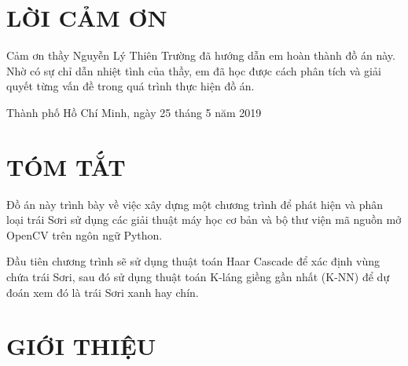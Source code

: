 \documentclass[12pt,a4paper]{article}
\begin{document}
\setcounter{page}{1}
\section*{LỜI CẢM ƠN}
Cảm ơn thầy Nguyễn Lý Thiên Trường đã hướng dẫn em hoàn thành đồ án này. Nhờ có sự chỉ dẫn nhiệt tình của thầy, em đã học được cách phân tích và giải quyết từng vấn đề trong quá trình thực hiện đồ án.

\begin{flushright}
Thành phố Hồ Chí Minh, ngày 25 tháng 5 năm 2019 
\end{flushright} 
\pagebreak
\section*{TÓM TẮT}
Đồ án này trình bày về việc xây dựng một chương trình để phát hiện và phân loại trái Sơri sử dụng các giải thuật máy học cơ bản và bộ thư viện mã nguồn mở OpenCV trên ngôn ngữ Python.

Đầu tiên chương trình sẽ sử dụng thuật toán Haar Cascade để xác định vùng chứa trái Sơri, sau đó sử dụng thuật toán K-láng giềng gần nhất (K-NN) để dự đoán xem đó là trái Sơri xanh hay chín.
 
\pagebreak
\tableofcontents
\pagebreak
\listoffigures
\pagebreak
\listoftables
\pagebreak
\setcounter{page}{1}
\section{GIỚI THIỆU}
\end{document}
